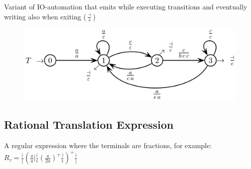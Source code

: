 Variant of IO-automation that emits while executing transitions and eventually writing also when exiting ($\frac{\dashv}{s}$)

\begin{figure}[H]
    \centering
    \includegraphics[width=0.9\linewidth]{syntax/sequential-transducer.png}
\end{figure}

\subsection{Rational Translation Expression}

A regular expression where the terminals are fractions, for example:
$R_\tau = \frac{(}{(} \left( \frac{a}{a} | \frac{(}{\epsilon} \left(\frac{a}{2a}\right)^+ \frac{)}{\epsilon} \right)^+ \frac{)}{)}$
